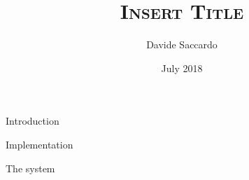 \documentclass[twoside,english, a4paper, 11pt]{shared/fysbachelor}
\author{Davide Saccardo}
\title{{\scshape Insert Title}}
\date{July 2018}
\begin{document}


\maketitle

%		

\begin{dedication}
	\null\vfill
	\begin{flushright}
		
		\vspace{12pt}
	\end{flushright}
	\null\vfill
\end{dedication}

\clearpage
\cleardoublepage

\begin{abstract}
	
	\clearpage
\end{abstract}


\tableofcontents
\clearpage 

\begin{chapter}{Introduction}
	\label{chap:intro}
	  
\end{chapter}

%


\begin{part}{Implementation}
	\label{part:implementation}
	
	\begin{chapter}{The system}
		\label{chap:system}
		
	\end{chapter}
	
%  		
%
%		
\end{part}
\end{document}
